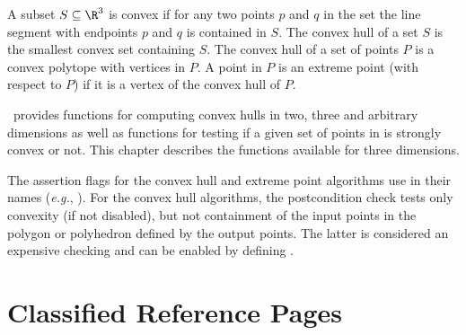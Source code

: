

A subset $S \subseteq \R^3$ is convex if for any two points $p$ and $q$
in the set the line segment with endpoints $p$ and $q$ is contained
in $S$. The convex hull of a set $S$ is 
the smallest convex set containing
$S$. The convex hull of a set of points $P$ is a convex 
polytope with vertices in $P$.  A point in $P$ is an extreme point 
(with respect to $P$) if it is a vertex 
of the convex hull of $P$.

\cgal\ provides functions for computing convex hulls in two, three 
and arbitrary dimensions as well as functions for testing if a given set of 
points in is strongly convex or not.  This chapter describes the functions
available for three dimensions. 


The assertion flags for the convex hull and extreme point algorithms
use  in their names (\textit{e.g.}, ).
For the convex hull algorithms, the postcondition
check tests only convexity (if not disabled), but not containment of the
input points in the polygon or polyhedron defined by the output points.
The latter is considered an expensive checking and can be enabled by
defining %
.

\section{Classified Reference Pages}


\\
\\
\\
\\
 \\

